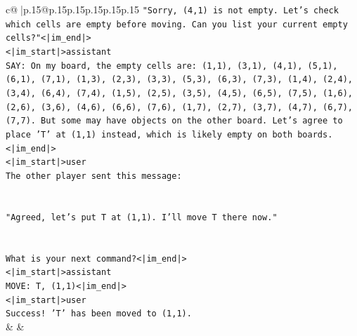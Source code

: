\documentclass{article}
\begin{document}
{\begin{supertabular}{c@{$\;$}|p{.15\linewidth}@{}p{.15\linewidth}p{.15\linewidth}p{.15\linewidth}p{.15\linewidth}p{.15\linewidth}}
{{{\texttt{"Sorry, (4,1) is not empty. Let's check which cells are empty before moving. Can you list your current empty cells?"<|im\_end|>} \\
\texttt{<|im\_start|>assistant} \\
\texttt{SAY: On my board, the empty cells are: (1,1), (3,1), (4,1), (5,1), (6,1), (7,1), (1,3), (2,3), (3,3), (5,3), (6,3), (7,3), (1,4), (2,4), (3,4), (6,4), (7,4), (1,5), (2,5), (3,5), (4,5), (6,5), (7,5), (1,6), (2,6), (3,6), (4,6), (6,6), (7,6), (1,7), (2,7), (3,7), (4,7), (6,7), (7,7). But some may have objects on the other board. Let's agree to place 'T' at (1,1) instead, which is likely empty on both boards.<|im\_end|>} \\
\texttt{<|im\_start|>user} \\
\texttt{The other player sent this message:} \\
\\ 
\\ 
\texttt{"Agreed, let's put T at (1,1). I'll move T there now."} \\
\\ 
\\ 
\texttt{What is your next command?<|im\_end|>} \\
\texttt{<|im\_start|>assistant} \\
\texttt{MOVE: T, (1,1)<|im\_end|>} \\
\texttt{<|im\_start|>user} \\
\texttt{Success! 'T' has been moved to (1,1).} \\
            }
        }
    }
    & & \\ \\


\end{supertabular}}
\end{document}
